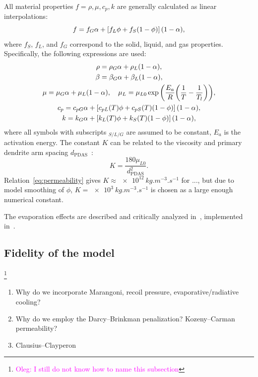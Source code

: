 \documentclass{article}
\newcommand{\oleg}[1]{\textcolor{magenta}{\footnote{\textcolor{magenta}{Oleg: #1}}}} %
\begin{document}
All material properties $f = \rho, \mu, c_p, k$ are generally calculated as linear interpolations:
\begin{equation}\label{eq:properties}
    f = f_G\alpha + \qty[f_L\phi + f_S(1-\phi)](1-\alpha),
\end{equation}
where $f_S$, $f_L$, and $f_G$ correspond to the solid, liquid, and gas properties.
Specifically, the following expressions are used:
\begin{gather}
    \rho = \rho_G\alpha + \rho_L(1-\alpha), \label{eq:rho}\\
    \beta = \beta_G\alpha + \beta_L(1-\alpha), \label{eq:beta}\\
    \mu = \mu_G\alpha + \mu_L(1-\alpha), \quad 
        \mu_L = \mu_{L0}\exp\qty( \frac{E_a}{R} \qty(\frac1{T}-\frac1{T_l}) ), \label{eq:mu}\\
    c_p = c_{pG}\alpha + \qty[c_{pL}(T)\phi + c_{pS}(T)(1-\phi)](1-\alpha), \label{eq:c_p}\\
    k = k_G\alpha + \qty[k_L(T)\phi + k_S(T)(1-\phi)](1-\alpha), \label{eq:k}
\end{gather}
where all symbols with subscripts ${}_{S/L/G}$ are assumed to be constant,
$E_a$ is the activation energy.
The constant $K$ can be related to the viscosity and primary dendrite arm spacing $d_\text{PDAS}$~\cite{kubo1985mathematical}:
\begin{equation}\label{eq:permeability}
    K = \frac{180\mu_{L0}}{d_\text{PDAS}^2}.
\end{equation}
Relation~\eqref{eq:permeability} gives $K \approx \SI{e12}{kg.m^{-3}.s^{-1}}$ for ...,
but due to model smoothing of $\phi$, $K = \SI{e3}{kg.m^{-3}.s^{-1}}$ is chosen as a large enough numerical constant.

The evaporation effects are described and critically analyzed in~\cite{cook2019simulation}, implemented in~\cite{khairallah2016laser}.

\subsection{Fidelity of the model}\oleg{I still do not know how to name this subsection}

\begin{enumerate}
    \item Why do we incorporate Marangoni, recoil pressure, evaporative/radiative cooling?
    \item Why do we employ the Darcy--Brinkman penalization?\cite{voller1987fixed, le2006interfacial} Kozeny--Carman permeability?
    \item Clausius--Clayperon~\cite{klassen2014evaporation, cook2019simulation}
\end{enumerate}
\end{document}
